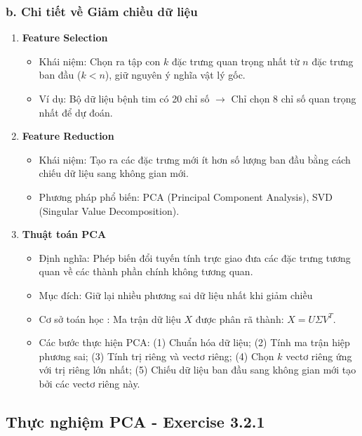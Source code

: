 \subsubsection*{b. Chi tiết về Giảm chiều dữ liệu}
\begin{enumerate}
    \item \textbf{Feature Selection}
    \begin{itemize}
        \item Khái niệm: Chọn ra tập con $k$ đặc trưng quan trọng nhất từ $n$ đặc trưng ban đầu ($k < n$), giữ nguyên ý nghĩa vật lý gốc.
        \item Ví dụ: Bộ dữ liệu bệnh tim có 20 chỉ số $\rightarrow$ Chỉ chọn 8 chỉ số quan trọng nhất để dự đoán.
    \end{itemize}

    \item \textbf{Feature Reduction}
    \begin{itemize}
        \item Khái niệm: Tạo ra các đặc trưng mới ít hơn số lượng ban đầu bằng cách chiếu dữ liệu sang không gian mới.
        \item Phương pháp phổ biến: PCA (Principal Component Analysis), SVD (Singular Value Decomposition).
    \end{itemize}

    \item \textbf{Thuật toán PCA}
    \begin{itemize}
        \item Định nghĩa: Phép biến đổi tuyến tính trực giao đưa các đặc trưng tương quan về các thành phần chính không tương quan.
        \item Mục đích: Giữ lại nhiều phương sai dữ liệu nhất khi giảm chiều
        \item Cơ sở toán học : Ma trận dữ liệu $X$ được phân rã thành: $X = U \Sigma V^T$.
        \item Các bước thực hiện PCA: (1) Chuẩn hóa dữ liệu; (2) Tính ma trận hiệp phương sai; (3) Tính trị riêng và vectơ riêng; (4) Chọn $k$ vectơ riêng ứng với trị riêng lớn nhất; (5) Chiếu dữ liệu ban đầu sang không gian mới tạo bởi các vectơ riêng này.
    \end{itemize}
\end{enumerate}

\subsection{Thực nghiệm PCA - Exercise 3.2.1}
\label{sec:pca321}
